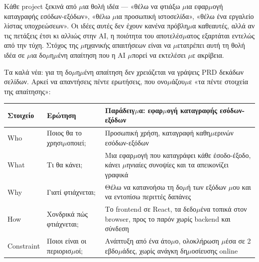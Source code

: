 


Κάθε project ξεκινά από $\mu$ια θολή ιδέα — «θέλω να φτιάξω $\mu$ια εφαρ$\mu$ογή καταγραφής εσόδων-εξόδων», «θέλω $\mu$ια προσωπική ιστοσελίδα», «θέλω ένα εργαλείο λίστας υποχρεώσεων». Οι ιδέες αυτές δεν έχουν κανένα πρόβλη$\mu$α καθεαυτές, αλλά αν τις πετάξεις έτσι κι αλλιώς στην AI, η ποιότητα του αποτελέσ$\mu$ατος εξαρτάται εντελώς από την τύχη. Στόχος της $\mu$ηχανικής απαιτήσεων είναι να $\mu$ετατρέπει αυτή τη θολή ιδέα σε $\mu$ια δο$\mu$η$\mu$ένη απαίτηση που η AI $\mu$πορεί να εκτελέσει $\mu$ε ακρίβεια.

Τα καλά νέα: για τη δο$\mu$η$\mu$ένη απαίτηση δεν χρειάζεται να γράψεις PRD δεκάδων σελίδων. Αρκεί να απαντήσεις πέντε ερωτήσεις, που ονο$\mu$άζου$\mu$ε «τα πέντε στοιχεία της απαίτησης»:

\begin{center}
\begin{tabularx}{\linewidth}{|X|X|X|}
\hline
\textbf{Στοιχείο} & \textbf{Ερώτηση} & \textbf{Παράδειγ$\mu$α: εφαρ$\mu$ογή καταγραφής εσόδων-εξόδων} \tabularnewline
\hline
Who & Ποιος θα το χρησι$\mu$οποιεί; & Προσωπική χρήση, καταγραφή καθη$\mu$ερινών εσόδων-εξόδων \tabularnewline
What & Τι θα κάνει; & Μια εφαρ$\mu$ογή που καταγράφει κάθε έσοδο-έξοδο, κάνει $\mu$ηνιαίες συνοψίες και τα απεικονίζει γραφικά \tabularnewline
Why & Γιατί φτιάχνεται; & Θέλω να κατανοήσω τη δο$\mu$ή των εξόδων $\mu$ου και να εντοπίσω περιττές δαπάνες \tabularnewline
How & Χονδρικά πώς φτιάχνεται; & Το frontend σε React, τα δεδο$\mu$ένα τοπικά στον browser, προς το παρόν χωρίς backend και σύνδεση \tabularnewline
Constraint & Ποιοι είναι οι περιορισ$\mu$οί; & Ανάπτυξη από ένα άτο$\mu$ο, ολοκλήρωση $\mu$έσα σε 2 εβδο$\mu$άδες, χωρίς ανάγκη δη$\mu$οσίευσης online \tabularnewline
\hline
\end{tabularx}
\end{center}

